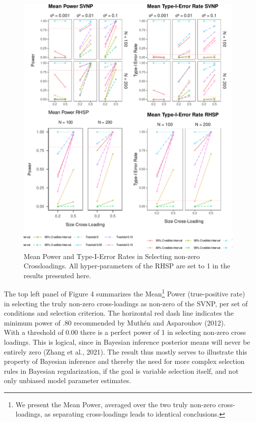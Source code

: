 \documentclass[
  english,
  man, donotrepeattitle,floatsintext]{apa6}
\begin{document}
\begin{figure}
\centering
\includegraphics{JMBKoch_thesis_files/figure-latex/unnamed-chunk-5-1.pdf}
\caption{\label{fig:unnamed-chunk-5}Mean Power and Type-I-Error Rates in Selecting non-zero Crossloadings. All hyper-parameters of the RHSP are set to 1 in the results presented here.}
\end{figure}

The top left panel of Figure 4 summarizes the Mean\footnote{We present the Mean Power, averaged over the two truly non-zero cross-loadings, as separating cross-loadings leads to identical conclusions.} Power (true-positive rate) in selecting the truly non-zero cross-loadings as non-zero of the SVNP, per set of conditions and selection criterion. The horizontal red dash line indicates the minimum power of .80 recommended by Muthén and Asparouhov (2012).\\
With a threshold of 0.00 there is a perfect power of 1 in selecting non-zero cross loadings. This is logical, since in Bayesian inference posterior means will never be entirely zero (Zhang et al., 2021). The result thus mostly serves to illustrate this property of Bayesian inference and thereby the need for more complex selection rules in Bayesian regularization, if the goal is variable selection itself, and not only unbiased model parameter estimates.
\end{document}

